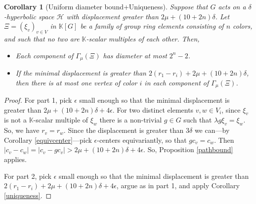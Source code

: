 \documentclass[11pt,letterpaper]{amsart}
\newtheorem{corollary}[theorem]{Corollary}
\begin{document}
\begin{corollary}[Uniform diameter bound+Uniqueness]
\label{diamcor}
Suppose that $G$ acts on a $\delta$-hyperbolic space $\mathcal H$ with displacement greater than $2\mu+(10+2n)\delta$. Let $\Xi=(\xi_v)_{v\in V}$ in $\mathbb K[G]$ be a family of group ring elements consisting of $n$ colors, and such that no two are $\mathbb K$-scalar multiples of each other. Then, 
\begin{itemize}
\item[1.] Each component of $\Gamma_{\mu}(\Xi)$ has diameter at most $2^n-2$.
\item[2.] If the minimal displacement is greater than $2(r_{1}-r_i)+2\mu+(10+2n)\delta$, then there is at most one vertex of color $i$ in each component of $\Gamma_{\mu}(\Xi)$.
\end{itemize}
\end{corollary} 
\begin{proof}
For part 1, pick $\epsilon$ small enough so that the minimal displacement is greater than $2\mu+(10+2n)\delta+4\epsilon$.
For two distinct elements $v,w\in V_i$, since $\xi_v$ is not a $\mathbb K$-scalar multiple of $\xi_w$ there is a non-trivial $g\in G$ such that $\lambda g\xi_v=\xi_w$. So, we have $r_v=r_w$. Since the displacement is greater than $3\delta$ we can---by Corollary \ref{equivcenter}---pick $\epsilon$-centers equivariantly, so that $gc_v=c_w$. Then $|c_v-c_w|=|c_v-gc_v|>2\mu+(10+2n)\delta+4\epsilon$. So, Proposition \ref{pathbound} applies. 

For part 2, pick $\epsilon$ small enough so that the minimal displacement is greater than $2(r_{1}-r_i)+2\mu+(10+2n)\delta+4\epsilon$, argue as in part 1, and apply Corollary \ref{uniqueness}.


\end{proof}
\end{document}
